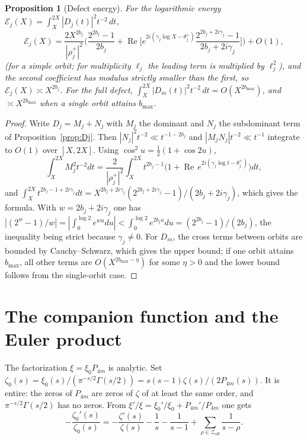 \documentclass[11pt]{amsart}
\newtheorem{proposition}[theorem]{Proposition}
\theoremstyle{definition}
\theoremstyle{remark}
\renewcommand{\Re}{\operatorname{Re}}
\newcommand{\half}{\tfrac12}
\newcommand{\Zoff}{\mathcal Z_{\mathrm{off}}}
\begin{document}
\begin{proposition}[Defect energy]\label{prop:energy}
For the logarithmic energy $\mathcal E_j(X)=\int_X^{2X}|D_j(t)|^2t^{-2}\,dt$,
\[
\mathcal E_j(X)=\frac{2X^{2b_j}}{|\rho_j^+|^2}\Big(\frac{2^{2b_j}-1}{2b_j}
+\Re\Big[e^{2i(\gamma_j\log X-\theta_j^+)}\frac{2^{2b_j+2i\gamma_j}-1}{2b_j+2i\gamma_j}\Big]\Big)+O(1),
\]
(for a simple orbit; for multiplicity $\ell_j$ the leading term is multiplied by $\ell_j^2$),
and the second coefficient has modulus strictly smaller than the first, so
$\mathcal E_j(X)\asymp X^{2b_j}$. For the full defect,
$\int_X^{2X}|D_m(t)|^2t^{-2}\,dt=O(X^{2b_{\max}})$, and $\asymp X^{2b_{\max}}$ when a single
orbit attains $b_{\max}$.
\end{proposition}
\begin{proof}
Write $D_j=M_j+N_j$ with $M_j$ the dominant and $N_j$ the subdominant term of
Proposition~\ref{prop:Dj}. Then $|N_j|^2t^{-2}\ll t^{-1-2b_j}$ and $|M_jN_j|t^{-2}\ll t^{-1}$
integrate to $O(1)$ over $[X,2X]$. Using $\cos^2u=\half(1+\cos2u)$,
\[
\int_X^{2X}M_j^2t^{-2}dt=\frac{2}{|\rho_j^+|^2}\int_X^{2X}t^{2b_j-1}\big(1+\Re\,
e^{2i(\gamma_j\log t-\theta_j^+)}\big)dt,
\]
and $\int_X^{2X}t^{2b_j-1+2i\gamma_j}dt=X^{2b_j+2i\gamma_j}(2^{2b_j+2i\gamma_j}-1)/(2b_j+2i\gamma_j)$,
which gives the formula. With $w=2b_j+2i\gamma_j$ one has
$|(2^w-1)/w|=|\int_0^{\log2}e^{wu}du|<\int_0^{\log2}e^{2b_ju}du=(2^{2b_j}-1)/(2b_j)$, the
inequality being strict because $\gamma_j\ne0$. For $D_m$, the cross terms between orbits are
bounded by Cauchy--Schwarz, which gives the upper bound; if one orbit attains $b_{\max}$, all
other terms are $O(X^{2b_{\max}-\eta})$ for some $\eta>0$ and the lower bound follows from the
single-orbit case.
\end{proof}

\section{The companion function and the Euler product}\label{sec:wall}

The factorization $\xi=\xi_0P_{4m}$ is analytic. Set
$\zeta_0(s)=\xi_0(s)/(\pi^{-s/2}\Gamma(s/2))=s(s-1)\zeta(s)/(2P_{4m}(s))$. It is entire: the
zeros of $P_{4m}$ are zeros of $\zeta$ of at least the same order, and $\pi^{-s/2}\Gamma(s/2)$
has no zeros. From $\xi'/\xi=\xi_0'/\xi_0+P_{4m}'/P_{4m}$ one gets
\[
-\frac{\zeta_0'(s)}{\zeta_0(s)}=-\frac{\zeta'(s)}{\zeta(s)}-\frac1s-\frac1{s-1}
+\sum_{\rho\in\Zoff}\frac{1}{s-\rho}.
\]
\end{document}
